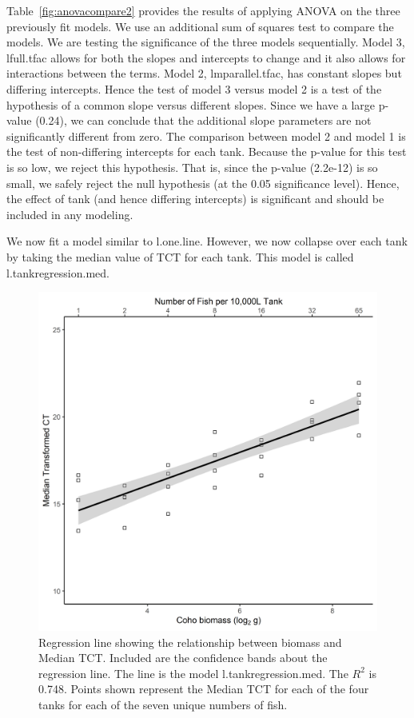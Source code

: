 Table~\ref{fig:anovacompare2} provides the results of applying ANOVA on the three previously fit models. We use an additional sum of squares test to compare the models. We are testing the significance of the three models sequentially. Model 3, lfull.tfac allows for both the slopes and intercepts to change and it also allows for interactions between the terms. Model 2, lmparallel.tfac, has constant slopes but differing intercepts. Hence the test of model 3 versus model 2 is a test of the hypothesis of a common slope versus different slopes. Since we have a large p-value (0.24), we can conclude that the additional slope parameters are not significantly different from zero. The comparison between model 2 and model 1 is the test of non-differing intercepts for each tank. Because the p-value for this test is so low, we reject this hypothesis. That is, since the p-value (2.2e-12) is so small, we safely reject the null hypothesis (at the 0.05 significance level). Hence, the effect of tank (and hence differing intercepts) is significant and should be included in any modeling. 

\newpage

We now fit a model similar to l.one.line. However, we now collapse over each tank by taking the median value of TCT for each tank. This model is called l.tankregression.med.

   \vspace{12pt}

\begin{figure}[H]
\includegraphics{Chapter3Images/ggplotnew5.png}
\caption{ \hspace{1mm}   Regression line showing the relationship between biomass and Median TCT. Included are the confidence bands about the regression line.  The line is the model l.tankregression.med. The $R^{2}$ is 0.748. Points shown represent the Median TCT for each of the four tanks for each of the seven unique numbers of fish.
}
\label{fig:medct44}
\end{figure}




